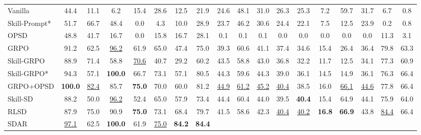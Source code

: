 \begin{table}[ht!]
{\begin{tabular}{l ccccccc cccccccc cc}
    Vanilla
        & 44.4 & 11.1 & 6.2 & 15.4 & 28.6 & 12.5 & 21.9
        & 24.6 & 48.1 & 31.0 & 26.3 & 25.3 & 7.2 & 59.7 & 31.7
        & 6.7 & 0.8
        \\
    Skill-Prompt*
        & 51.7 & 66.7 & 48.4 & 0.0 & 4.3 & 10.0 & 28.9
        & 23.7 & 46.2 & 30.6 & 24.4 & 22.1 & 7.5 & 12.5 & 23.9
        & 0.2 & 0.8
        \\
    OPSD
        & 48.8 & 41.7 & 16.7 & 0.0 & 15.8 & 16.7 & 28.1
        & 0.1 & 0.1 & 0.1 & 0.0 & 0.0 & 0.0 & 0.0 & 0.0
        & 11.3 & 3.1
        \\
    GRPO
        & 91.2 & 62.5 & \cellcolor{secondcolor}\underline{96.2} & 61.9 & 65.0 & 47.4 & 75.0
        & 39.3 & 60.6 & 41.1 & 37.4 & 34.6 & 15.4 & 26.4 & 36.4
        & 79.8 & 63.3
        \\
    Skill-GRPO
        & 88.9 & 71.4 & 58.8 & \cellcolor{secondcolor}\underline{70.6} & 40.7 & 29.2 & 60.2
        & 43.5 & 58.8 & 43.0 & 36.8 & 32.2 & 11.7 & 12.5 & 34.1
        & 77.3 & 60.9
        \\
    Skill-GRPO*
        & 94.3 & 57.1 & \cellcolor{topcolor}\textbf{100.0} & 66.7 & 73.1 & 57.1 & 80.5
        & 44.3 & 59.6 & 44.3 & 39.0 & 36.1 & 14.5 & 14.9 & 36.1
        & 76.3 & 66.4
        \\
    GRPO+OPSD
        & \cellcolor{topcolor}\textbf{100.0} & \cellcolor{secondcolor}\underline{82.4} & 85.7 & \cellcolor{topcolor}\textbf{75.0} & 70.0 & 60.0 & 81.2
        & \cellcolor{secondcolor}\underline{44.9} & \cellcolor{secondcolor}\underline{61.2} & \cellcolor{secondcolor}\underline{45.2} & \cellcolor{secondcolor}\underline{40.4} & 38.5 & 16.0 & \cellcolor{secondcolor}\underline{66.1} & \cellcolor{secondcolor}\underline{44.6}
        & 77.8 & 66.4
        \\
    Skill-SD
        & 88.2 & 50.0 & \cellcolor{secondcolor}\underline{96.2} & 52.4 & 65.0 & 57.9 & 73.4
        & 44.4 & 60.4 & 44.0 & 39.5 & \cellcolor{topcolor}\textbf{40.4} & 15.4 & 64.9 & 44.1
        & 75.9 & 64.0
        \\
    RLSD
        & 87.9 & 75.0 & 90.9 & \cellcolor{topcolor}\textbf{75.0} & 73.1 & 68.4 & 79.7
        & 41.5 & 58.6 & 42.3 & \cellcolor{secondcolor}\underline{40.4} & \cellcolor{secondcolor}\underline{40.2} & \cellcolor{topcolor}\textbf{16.8} & \cellcolor{topcolor}\textbf{66.9} & 43.8
        & \cellcolor{secondcolor}\underline{84.4} & 66.4
        \\
    SDAR
        & \cellcolor{secondcolor}\underline{97.1} & 62.5 & \cellcolor{topcolor}\textbf{100.0} & 61.9 & \cellcolor{secondcolor}\underline{75.0} & \cellcolor{topcolor}\textbf{84.2} & \cellcolor{topcolor}\textbf{84.4}

\end{tabular}}
\end{table}
